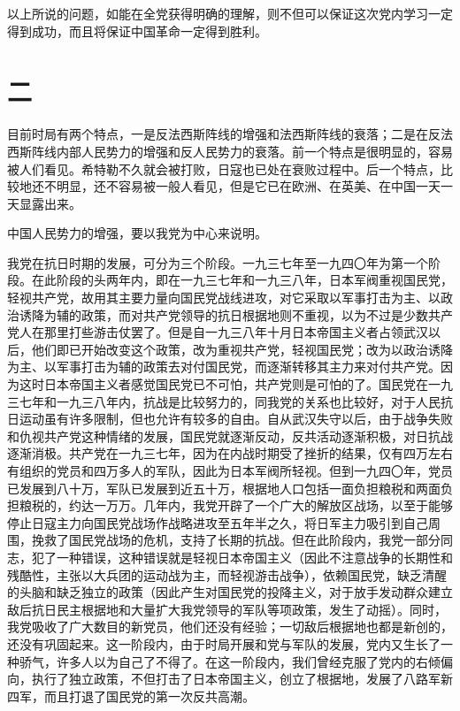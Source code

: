 以上所说的问题，如能在全党获得明确的理解，则不但可以保证这次党内学习一定得到成功，而且将保证中国革命一定得到胜利。

\section*{二}

目前时局有两个特点，一是反法西斯阵线的增强和法西斯阵线的衰落；二是在反法西斯阵线内部人民势力的增强和反人民势力的衰落。前一个特点是很明显的，容易被人们看见。希特勒不久就会被打败，日寇也已处在衰败过程中。后一个特点，比较地还不明显，还不容易被一般人看见，但是它已在欧洲、在英美、在中国一天一天显露出来。

中国人民势力的增强，要以我党为中心来说明。

我党在抗日时期的发展，可分为三个阶段。一九三七年至一九四〇年为第一个阶段。在此阶段的头两年内，即在一九三七年和一九三八年，日本军阀重视国民党，轻视共产党，故用其主要力量向国民党战线进攻，对它采取以军事打击为主、以政治诱降为辅的政策，而对共产党领导的抗日根据地则不重视，以为不过是少数共产党人在那里打些游击仗罢了。但是自一九三八年十月日本帝国主义者占领武汉以后，他们即已开始改变这个政策，改为重视共产党，轻视国民党；改为以政治诱降为主、以军事打击为辅的政策去对付国民党，而逐渐转移其主力来对付共产党。因为这时日本帝国主义者感觉国民党已不可怕，共产党则是可怕的了。国民党在一九三七年和一九三八年内，抗战是比较努力的，同我党的关系也比较好，对于人民抗日运动虽有许多限制，但也允许有较多的自由。自从武汉失守以后，由于战争失败和仇视共产党这种情绪的发展，国民党就逐渐反动，反共活动逐渐积极，对日抗战逐渐消极。共产党在一九三七年，因为在内战时期受了挫折的结果，仅有四万左右有组织的党员和四万多人的军队，因此为日本军阀所轻视。但到一九四〇年，党员已发展到八十万，军队已发展到近五十万，根据地人口包括一面负担粮税和两面负担粮税的，约达一万万。几年内，我党开辟了一个广大的解放区战场，以至于能够停止日寇主力向国民党战场作战略进攻至五年半之久，将日军主力吸引到自己周围，挽救了国民党战场的危机，支持了长期的抗战。但在此阶段内，我党一部分同志，犯了一种错误，这种错误就是轻视日本帝国主义（因此不注意战争的长期性和残酷性，主张以大兵团的运动战为主，而轻视游击战争），依赖国民党，缺乏清醒的头脑和缺乏独立的政策（因此产生对国民党的投降主义，对于放手发动群众建立敌后抗日民主根据地和大量扩大我党领导的军队等项政策，发生了动摇）。同时，我党吸收了广大数目的新党员，他们还没有经验；一切敌后根据地也都是新创的，还没有巩固起来。这一阶段内，由于时局开展和党与军队的发展，党内又生长了一种骄气，许多人以为自己了不得了。在这一阶段内，我们曾经克服了党内的右倾偏向，执行了独立政策，不但打击了日本帝国主义，创立了根据地，发展了八路军新四军，而且打退了国民党的第一次反共高潮。

